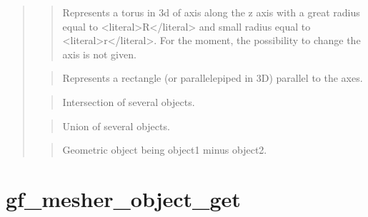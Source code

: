 \documentclass[a4paper,11pt,english]{sphinxmanual}
\begin{document}
\begin{quote}
\sphinxAtStartPar
{}
\begin{quote}

\sphinxAtStartPar
Represents a torus in 3d of axis along the z axis with a great radius
equal to \textless{}literal\textgreater{}R\textless{}/literal\textgreater{} and small radius equal to \textless{}literal\textgreater{}r\textless{}/literal\textgreater{}. For the moment, the
possibility to change the axis is not given.
\end{quote}

\sphinxAtStartPar
{}
\begin{quote}

\sphinxAtStartPar
Represents a rectangle (or parallelepiped in 3D) parallel to the axes.
\end{quote}

\sphinxAtStartPar
{}
\begin{quote}

\sphinxAtStartPar
Intersection of several objects.
\end{quote}

\sphinxAtStartPar
{}
\begin{quote}

\sphinxAtStartPar
Union of several objects.
\end{quote}

\sphinxAtStartPar
{}
\begin{quote}

\sphinxAtStartPar
Geometric object being object1 minus object2.
\end{quote}
\end{quote}


\section{gf\_mesher\_object\_get}
\label{\detokenize{scilab/cmdref_gf_mesher_object_get:gf-mesher-object-get}}\label{\detokenize{scilab/cmdref_gf_mesher_object_get::doc}}
\sphinxAtStartPar
{}
\end{document}
